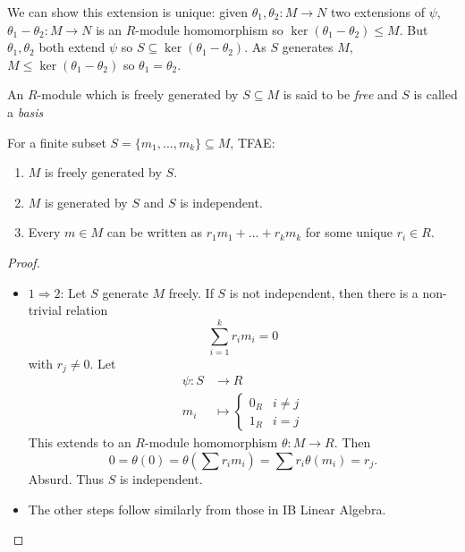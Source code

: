 \documentclass[a4paper]{article}
\begin{document}
\begin{note}
  We can show this extension is unique: given \(\theta_1, \theta_2: M \to N\) two extensions of \(\psi\), \(\theta_1 - \theta_2:M \to N\) is an \(R\)-module homomorphism so \(\ker(\theta_1 - \theta_2) \leq M\). But \(\theta_1, \theta_2\) both extend \(\psi\) so \(S \subseteq \ker(\theta_1 - \theta_2)\). As \(S\) generates \(M\), \(M \leq \ker(\theta_1 - \theta_2)\) so \(\theta_1 = \theta_2\).
\end{note}

An \(R\)-module which is freely generated by \(S \subseteq M\) is said to be \emph{free} and \(S\) is called a \emph{basis}

\begin{proposition}
  For a finite subset \(S = \{m_1, \dots, m_k\} \subseteq M\), TFAE:
  \begin{enumerate}
  \item \(M\) is freely generated by \(S\).
  \item \(M\) is generated by \(S\) and \(S\) is independent.
  \item Every \(m \in M\) can be written as \(r_1m_1 + \dots + r_km_k\) for some unique \(r_i \in R\).
  \end{enumerate}
\end{proposition}

\begin{proof}\leavevmode
  \begin{itemize}
  \item \(1 \Rightarrow 2\): Let \(S\) generate \(M\) freely. If \(S\) is not independent, then there is a non-trivial relation
    \[
      \sum_{i = 1}^k r_im_i = 0
    \]
    with \(r_j \neq 0\). Let
    \begin{align*}
      \psi: S &\to R \\
      m_i &\mapsto
            \begin{cases}
              0_R & i \neq j \\
              1_R & i = j
            \end{cases}
    \end{align*}
    This extends to an \(R\)-module homomorphism \(\theta: M \to R\). Then
    \[
      0 = \theta(0) = \theta \left(\sum r_im_i \right) = \sum r_i\theta(m_i) = r_j.
    \]
    Absurd. Thus \(S\) is independent.
  \item The other steps follow similarly from those in IB Linear Algebra.
  \end{itemize}
\end{proof}
\end{document}
